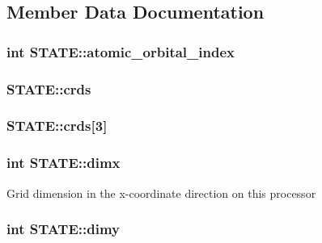 \subsection{Member Data Documentation}
\hypertarget{struct_s_t_a_t_e_aa8acfa4d06c6669d0ad72c43cf066d4a}{
\subsubsection[{atomic\-\_\-orbital\-\_\-index}]{\setlength{\rightskip}{0pt plus 5cm}int S\-T\-A\-T\-E\-::atomic\-\_\-orbital\-\_\-index}}\label{struct_s_t_a_t_e_aa8acfa4d06c6669d0ad72c43cf066d4a}
\hypertarget{struct_s_t_a_t_e_a104e56d7f0b8320f2df5f52e7212b2bf}{
\subsubsection[{crds}]{ S\-T\-A\-T\-E\-::crds}}\label{struct_s_t_a_t_e_a104e56d7f0b8320f2df5f52e7212b2bf}
\hypertarget{struct_s_t_a_t_e_a39a94642592ae85a45fc8e57ce5be089}{
\subsubsection[{crds}]{ S\-T\-A\-T\-E\-::crds\mbox{[}3\mbox{]}}}\label{struct_s_t_a_t_e_a39a94642592ae85a45fc8e57ce5be089}
\hypertarget{struct_s_t_a_t_e_aa31886b5a2d1c5e2083d40365fd32227}{
\subsubsection[{dimx}]{\setlength{\rightskip}{0pt plus 5cm}int S\-T\-A\-T\-E\-::dimx}}\label{struct_s_t_a_t_e_aa31886b5a2d1c5e2083d40365fd32227}
Grid dimension in the x-\/coordinate direction on this processor \hypertarget{struct_s_t_a_t_e_a8943da72cd875d3b652258cacaaff5b5}{
\subsubsection[{dimy}]{\setlength{\rightskip}{0pt plus 5cm}int S\-T\-A\-T\-E\-::dimy}}\label{struct_s_t_a_t_e_a8943da72cd875d3b652258cacaaff5b5}
